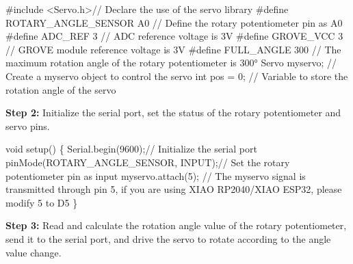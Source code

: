 \documentclass[
  letterpaper,
  DIV=11,
  numbers=noendperiod]{scrreprt}
\newenvironment{Shaded}{\begin{snugshade}}{\end{snugshade}}
\newcommand{\CommentTok}[1]{\textcolor[rgb]{0.37,0.37,0.37}{#1}}
\newcommand{\DataTypeTok}[1]{\textcolor[rgb]{0.68,0.00,0.00}{#1}}
\newcommand{\DecValTok}[1]{\textcolor[rgb]{0.68,0.00,0.00}{#1}}
\newcommand{\ImportTok}[1]{\textcolor[rgb]{0.00,0.46,0.62}{#1}}
\newcommand{\NormalTok}[1]{\textcolor[rgb]{0.00,0.23,0.31}{#1}}
\newcommand{\OperatorTok}[1]{\textcolor[rgb]{0.37,0.37,0.37}{#1}}
\newcommand{\PreprocessorTok}[1]{\textcolor[rgb]{0.68,0.00,0.00}{#1}}
\begin{document}
\begin{Shaded}
\begin{Highlighting}[]
\PreprocessorTok{\#include }\ImportTok{\textless{}Servo.h\textgreater{}}\CommentTok{// Declare the use of the servo library}
\PreprocessorTok{\#define ROTARY\_ANGLE\_SENSOR }\NormalTok{A0}\PreprocessorTok{ }\CommentTok{// Define the rotary potentiometer pin as A0}
\PreprocessorTok{\#define ADC\_REF }\DecValTok{3}\PreprocessorTok{ }\CommentTok{// ADC reference voltage is 3V}
\PreprocessorTok{\#define GROVE\_VCC }\DecValTok{3}\PreprocessorTok{ }\CommentTok{// GROVE module reference voltage is 3V}
\PreprocessorTok{\#define FULL\_ANGLE }\DecValTok{300}\PreprocessorTok{ }\CommentTok{// The maximum rotation angle of the rotary potentiometer is 300°}
\NormalTok{Servo myservo}\OperatorTok{;}  \CommentTok{// Create a myservo object to control the servo}
\DataTypeTok{int}\NormalTok{ pos }\OperatorTok{=} \DecValTok{0}\OperatorTok{;} \CommentTok{// Variable to store the rotation angle of the servo}
\end{Highlighting}
\end{Shaded}

\textbf{Step 2:} Initialize the serial port, set the status of the
rotary potentiometer and servo pins.

\begin{Shaded}
\begin{Highlighting}[]
\DataTypeTok{void}\NormalTok{ setup}\OperatorTok{()} \OperatorTok{\{}
\NormalTok{    Serial}\OperatorTok{.}\NormalTok{begin}\OperatorTok{(}\DecValTok{9600}\OperatorTok{);}\CommentTok{// Initialize the serial port}
\NormalTok{    pinMode}\OperatorTok{(}\NormalTok{ROTARY\_ANGLE\_SENSOR}\OperatorTok{,}\NormalTok{ INPUT}\OperatorTok{);}\CommentTok{// Set the rotary potentiometer pin as input}
\NormalTok{    myservo}\OperatorTok{.}\NormalTok{attach}\OperatorTok{(}\DecValTok{5}\OperatorTok{);}  \CommentTok{// The myservo signal is transmitted through pin 5, if you are using XIAO RP2040/XIAO ESP32, please modify 5 to D5}
\OperatorTok{\}}
\end{Highlighting}
\end{Shaded}

\textbf{Step 3:} Read and calculate the rotation angle value of the
rotary potentiometer, send it to the serial port, and drive the servo to
rotate according to the angle value change.
\end{document}
